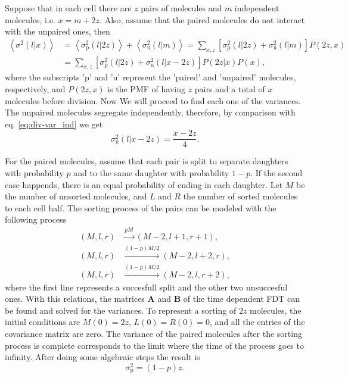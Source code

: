 Suppose that in each cell there are $z$ pairs of molecules and $m$ independent molecules, i.e. $x=m+2z$. Also, assume that the paired molecules do not interact with the unpaired ones, then
\begin{equation}
  \label{eq:div-pu}
  \begin{split}
    \left\langle\sigma^2(l|x)\right\rangle &= \left\langle\sigma^2_\text{p}(l|2z)\right\rangle + \left\langle\sigma^2_\text{u}(l|m)\right\rangle = \sum_{x,z}\left[\sigma^2_\text{p}(l|2z) + \sigma^2_\text{u}(l|m)\right]P(2z,x)\\
    &= \sum_{x,z}\left[\sigma^2_\text{p}(l|2z) + \sigma^2_\text{u}(l|x-2z)\right]P(2z|x)P(x),
  \end{split}
\end{equation}
where the subscripts 'p' and 'u' represent the 'paired' and 'unpaired' molecules, respectively, and $P(2z,x)$ is the PMF of having $z$ pairs and a total of $x$ molecules before division. Now We will proceed to find each one of the variances. The unpaired molecules segregate independently, therefore, by comparison with eq. \eqref{eq:div-var_ind} we get
\begin{equation}
  \label{eq:div-u}
  \sigma^2_\text{u}(l|x-2z) = \frac{x-2z}{4}.
\end{equation}

For the paired molecules, assume that each pair is split to separate daughters with probability $p$ and to the same daughter with probability $1-p$. If the second case happends, there is an equal probability of ending in each daughter. Let $M$ be the number of unsorted molecules, and $L$ and $R$ the number of sorted molecules to each cell half. The sorting process of the pairs can be modeled with the following process
\begin{equation*}
  \begin{split}
    (M,l,r)&\xrightarrow{pM}(M-2,l+1,r+1),\\
    (M,l,r)&\xrightarrow{(1-p)M/2}(M-2,l+2,r),\\
    (M,l,r)&\xrightarrow{(1-p)M/2}(M-2,l,r+2),
  \end{split}
\end{equation*}
where the first line represents a succesfull split and the other two unsuccesful ones. With this relations, the matrices $\mathbf{A}$ and $\mathbf{B}$ of the time dependent FDT can be found and solved for the variances. To represent a sorting of $2z$ molecules, the initial conditions are $M(0) = 2z$, $L(0) = R(0)=0$, and all the entries of the covariance matrix are zero. The variance of the paired molecules after the sorting process is complete corresponds to the limit where the time of the process goes to infinity. After doing some algebraic steps the result is
\begin{equation}
  \label{eq:div-p}
  \sigma^2_\text{p}=(1-p)z.
\end{equation}

